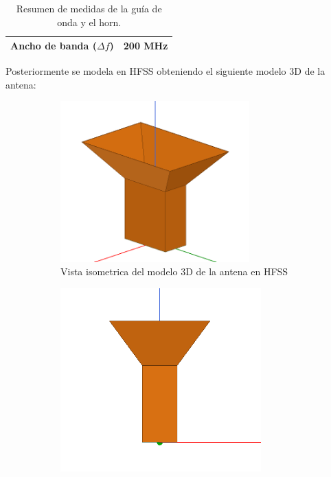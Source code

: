 \begin{itemize}
\begin{table}[H]
\begin{tabular}{|l|l|}
		Ancho de banda ($\Delta f$)                         & 200 MHz                     \\ \hline
		\end{tabular}
		\caption{Resumen de medidas de la guía de onda y el horn.}
		\label{tab:waveguide_horn}
		\end{table}
	Posteriormente se modela en HFSS obteniendo el siguiente modelo 3D de la antena:
	\begin{figure}[H]
		\centering
		\begin{subfigure}[b]{0.45\textwidth}
			\centering
			\includegraphics[width=0.8\textwidth]{img/ejemplos/Figure_2}
			\caption{Vista isometrica del modelo 3D de la antena en HFSS}
			\label{fig:Imagen-Madrid}
		\end{subfigure}
		\hfill
		\begin{subfigure}[b]{0.45\textwidth}
			\centering
			\includegraphics[width=0.85\textwidth]{img/ejemplos/Figure_3}

\end{subfigure}
\end{figure}
\end{itemize}
